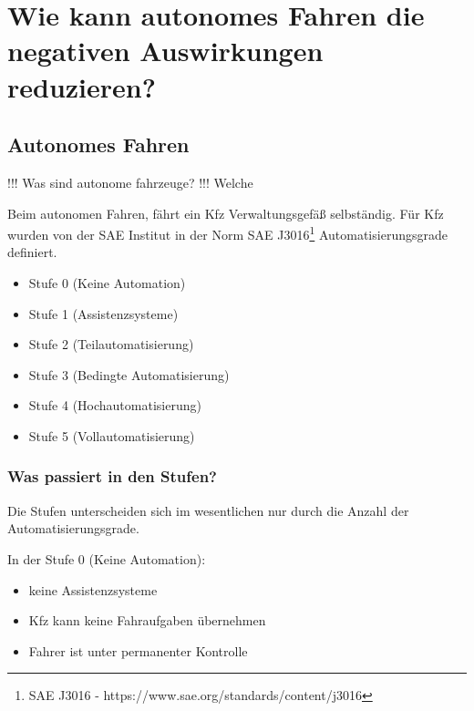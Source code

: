 \section{Wie kann autonomes Fahren die negativen Auswirkungen reduzieren?}


\subsection{Autonomes Fahren}

!!! Was sind autonome fahrzeuge?
!!! Welche 


Beim autonomen Fahren, fährt ein \ac{Kfz} Verwaltungsgefäß selbständig.
Für \ac{Kfz} wurden von der \ac{SAE} Institut in der Norm SAE J3016\footnote{SAE J3016 - https://www.sae.org/standards/content/j3016} Automatisierungsgrade definiert.
\begin{itemize}
	\item Stufe 0 (Keine Automation)
	\item Stufe 1 (Assistenzsysteme)
	\item Stufe 2 (Teilautomatisierung)
	\item Stufe 3 (Bedingte Automatisierung)
	\item Stufe 4 (Hochautomatisierung)
	\item Stufe 5 (Vollautomatisierung)
\end{itemize}
\subsubsection{Was passiert in den Stufen?}
Die Stufen unterscheiden sich im wesentlichen nur durch die Anzahl der Automatisierungsgrade.

\vspace{0.5cm}

In der Stufe 0 (Keine Automation):
\begin{itemize}
	\item keine Assistenzsysteme
	\item \ac{Kfz} kann keine Fahraufgaben übernehmen
	\item Fahrer ist unter permanenter Kontrolle
\end{itemize}

